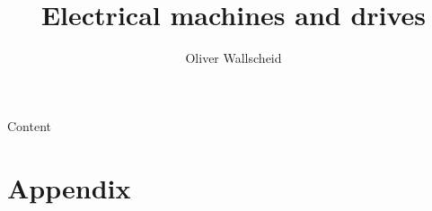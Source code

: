 \documentclass{../course_template/lectureClass}
\title{Electrical machines and drives}
\author{Oliver Wallscheid}
\date{}
\begin{document}


\begin{frame}[plain]
    \titlepage
\end{frame}

\begin{frame}{Content}
    \tableofcontents[hideallsubsections]
\end{frame}


\section{Appendix} %
\end{document}
